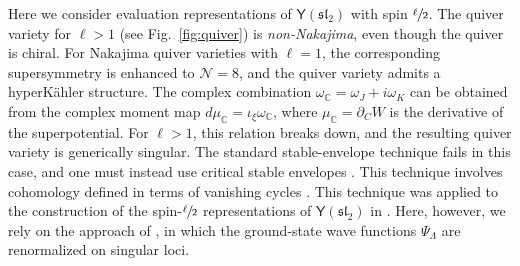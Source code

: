 \documentclass[10pt]{article}
\theoremstyle{definition}
\def\fl{\mathfrak{l}}
\def\fs{\mathfrak{s}}
\def\fs{\mathfrak{s}}
\def\myY{{\mathsf{Y}}}
\numberwithin{equation}{section}
\begin{document}
Here we consider evaluation representations of $\myY(\fs\fl_2)$ with spin $\sfrac{\ell}{2}$.
The quiver variety for $\ell>1$ (see Fig.~\ref{fig:quiver}) is \emph{non-Nakajima}, even though the quiver is chiral.
For Nakajima quiver varieties with $\ell=1$, the corresponding supersymmetry is enhanced to $\mathcal{N}=8$, and the quiver variety admits a hyperK\"ahler structure.
The complex combination $\omega_{\mathbb{C}}=\omega_J+i\omega_K$ can be obtained from the complex moment map $d\mu_{\mathbb{C}}=\iota_\xi\omega_{\mathbb{C}}$, where $\mu_{\mathbb{C}}=\partial_{C}W$ is the derivative of the superpotential.
For $\ell>1$, this relation breaks down, and the resulting quiver variety is generically singular.
The standard stable-envelope technique fails in this case, and one must instead use critical stable envelopes \cite{Cao:2026vwf}.
This technique involves cohomology defined in terms of vanishing cycles \cite{yang2020two,Rapcak:2018nsl,Rapcak:2020ueh}.
This technique was applied to the construction of the spin-$\sfrac{\ell}{2}$ representations of $\myY(\fs\fl_2)$ in \cite{Bykov:2019cst}.
Here, however, we rely on the approach of \cite{Galakhov:2020vyb}, in which the ground-state wave functions $\Psi_{\Lambda}$ are renormalized on singular loci.
\end{document}
